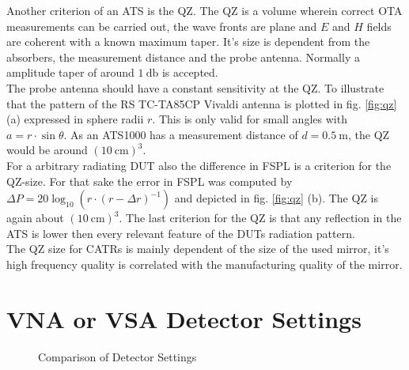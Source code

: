 Another criterion of an \ac{ATS} is the \ac{QZ}. The \ac{QZ} is a volume wherein correct \ac{OTA} measurements can be carried out, the wave fronts are plane and $E$ and $H$ fields are coherent with a known maximum taper. It's size is dependent from the absorbers, the measurement distance and the probe antenna. Normally a amplitude taper of around $\SI{1}{\decibel}$ is accepted.\\
The probe antenna should have a constant sensitivity at the \ac{QZ}. To illustrate that the pattern of the \ac{RS} TC-TA85CP Vivaldi antenna is plotted in fig. \ref{fig:qz} (a) expressed in sphere radii $r$. This is only valid for small angles with $a=r\cdot\sin \theta$. As an ATS1000 has a measurement distance of $d = \SI{0.5}{\meter}$, the \ac{QZ} would be around $\left(\SI{10}{\centi\meter}\right)^3$.\\
For a arbitrary radiating \ac{DUT} also the difference in \ac{FSPL} is a criterion for the \ac{QZ}-size. For that sake the error in \ac{FSPL} was computed by $\Delta P = 20\log_{10}\left(r\cdot\left(r-\Delta r\right)^{-1}\right)$ and depicted in fig. \ref{fig:qz} (b). The \ac{QZ} is again about $\left(\SI{10}{\centi\meter}\right)^3$. The last criterion for the \ac{QZ} is that any reflection in the \ac{ATS} is lower then every relevant feature of the \ac{DUT}s radiation pattern.\cite{ach}\\
The \ac{QZ} size for \acp{CATR} is mainly dependent of the size of the used mirror, it's high frequency quality is correlated with the manufacturing quality of the mirror.

\section{VNA or VSA Detector Settings}

\begin{figure}[h]
\centering
\def\svgwidth{0.7\textwidth}

\caption{Comparison of Detector Settings \cite{funsspec}}
\label{fig:detset}
\end{figure}

